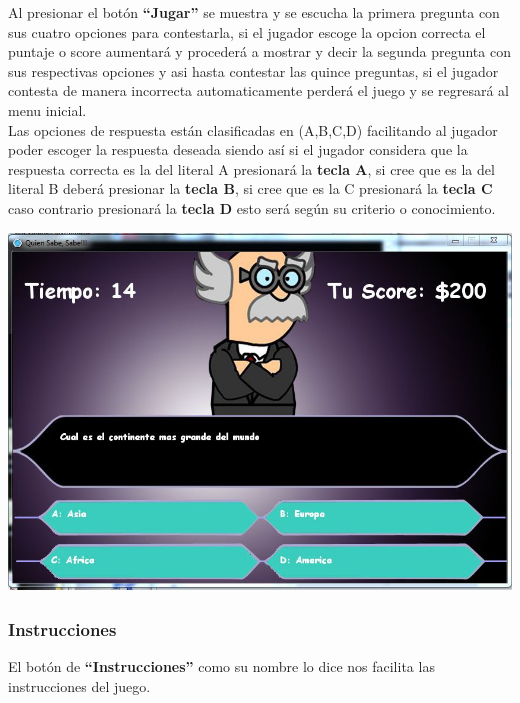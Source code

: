 \documentclass[a4paper,11pt]{article}
\begin{document}
{Al presionar el bot\'{o}n \textbf{``Jugar''} se muestra y se escucha la primera pregunta con sus cuatro opciones para contestarla, si el jugador escoge la opcion correcta el puntaje o score aumentar\'{a} y proceder\'{a} a mostrar y decir la segunda pregunta con sus respectivas opciones y asi hasta contestar las quince preguntas, si el jugador contesta de manera incorrecta automaticamente perder\'{a} el juego y se regresar\'{a} al menu inicial.
\\
Las opciones de respuesta est\'{a}n clasificadas en (A,B,C,D) facilitando al jugador poder escoger la respuesta deseada siendo as\'{i} si el jugador considera que la respuesta correcta es la del literal A presionar\'{a} la \textbf{tecla A}, si cree que es la del literal B deber\'{a} presionar la \textbf{tecla B}, si cree que es la C presionar\'{a} la \textbf{tecla C} caso contrario presionar\'{a} la \textbf{tecla D} esto ser\'{a} seg\'{u}n su criterio o conocimiento.
	\begin{center}
		\includegraphics[scale=0.5]{images/jugando1.jpg}
	\end{center}
	
\subsubsection{Instrucciones}
	
	El bot\'{o}n de \textbf{``Instrucciones''} como su nombre lo dice nos facilita las instrucciones del juego.
		\newline

}
\end{document}
